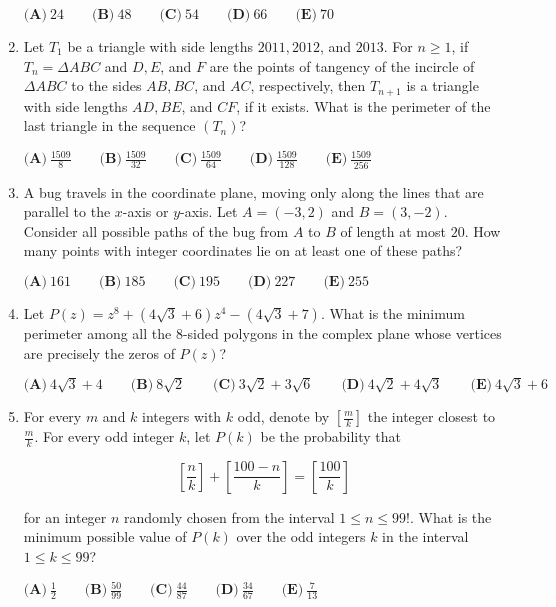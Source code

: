 \documentclass{article}
\begin{document}
\begin{enumerate}[label=\arabic*., itemsep=0.5em]
$\textbf{(A)}\ 24 \qquad \textbf{(B)}\ 48 \qquad \textbf{(C)}\ 54 \qquad \textbf{(D)}\ 66 \qquad \textbf{(E)}\ 70$\par \vspace{0.5em}\item Let $T_1$ be a triangle with side lengths $2011, 2012$, and $2013$. For $n \geq 1$, if $T_n = \Delta ABC$ and $D, E$, and $F$ are the points of tangency of the incircle of $\Delta ABC$ to the sides $AB, BC$, and $AC$, respectively, then $T_{n+1}$ is a triangle with side lengths $AD, BE$, and $CF$, if it exists. What is the perimeter of the last triangle in the sequence $\left(T_n\right)$?

$\textbf{(A)}\ \frac{1509}{8} \qquad \textbf{(B)}\  \frac{1509}{32} \qquad \textbf{(C)}\  \frac{1509}{64} \qquad \textbf{(D)}\  \frac{1509}{128} \qquad \textbf{(E)}\  \frac{1509}{256}$\par \vspace{0.5em}\item A bug travels in the coordinate plane, moving only along the lines that are parallel to the $x$-axis or $y$-axis. Let $A = (-3, 2)$ and $B = (3, -2)$. Consider all possible paths of the bug from $A$ to $B$ of length at most $20$. How many points with integer coordinates lie on at least one of these paths?

$\textbf{(A)}\ 161 \qquad \textbf{(B)}\ 185 \qquad \textbf{(C)}\  195 \qquad \textbf{(D)}\  227 \qquad \textbf{(E)}\  255$\par \vspace{0.5em}\item Let $P(z) = z^8 + \left(4\sqrt{3} + 6\right)z^4 - \left(4\sqrt{3} + 7\right)$. What is the minimum perimeter among all the $8$-sided polygons in the complex plane whose vertices are precisely the zeros of $P(z)$?

$\textbf{(A)}\ 4\sqrt{3} + 4 \qquad \textbf{(B)}\ 8\sqrt{2} \qquad \textbf{(C)}\  3\sqrt{2} + 3\sqrt{6} \qquad \textbf{(D)}\  4\sqrt{2} + 4\sqrt{3} \qquad \textbf{(E)}\  4\sqrt{3} + 6$\par \vspace{0.5em}\item For every $m$ and $k$ integers with $k$ odd, denote by $\left[\frac{m}{k}\right]$ the integer closest to $\frac{m}{k}$. For every odd integer $k$, let $P(k)$ be the probability that


\begin{equation*}
\left[\frac{n}{k}\right] + \left[\frac{100 - n}{k}\right] = \left[\frac{100}{k}\right]
\end{equation*}


for an integer $n$ randomly chosen from the interval $1 \leq n \leq 99!$. What is the minimum possible value of $P(k)$ over the odd integers $k$ in the interval $1 \leq k \leq 99$?

$\textbf{(A)}\ \frac{1}{2} \qquad \textbf{(B)}\ \frac{50}{99} \qquad \textbf{(C)}\ \frac{44}{87} \qquad \textbf{(D)}\  \frac{34}{67} \qquad \textbf{(E)}\  \frac{7}{13}$\par \vspace{0.5em}\end{enumerate}
\end{document}
